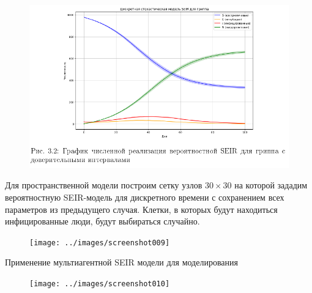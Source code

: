 \documentclass[notheorems]{beamer}
\begin{document}
\begin{frame}
	\begin{figure}
		\centering
		\includegraphics[scale=0.5]{"../../Курсовая работа MFVAR/slides/screenshot008"}
		\caption{}
		\label{fig:screenshot008}
	\end{figure}
	
\end{frame}

\begin{frame}
	Для пространственной модели построим сетку узлов $30 \times 30$ на которой зададим вероятностную SEIR-модель для дискретного времени с сохранением всех параметров из предыдущего случая. Клетки, в которых будут находиться инфицированные люди, будут выбираться случайно.
	\begin{figure}
		\centering
		\texttt{[image: ../images/screenshot009]}
		\caption{}
		\label{fig:screenshot009}
	\end{figure}
	
\end{frame}

\begin{frame}
	
	{Применение мультиагентной SEIR модели для моделирования}
	\begin{figure}
		\centering
		\texttt{[image: ../images/screenshot010]}
		\caption{}
		\label{fig:screenshot010}
	\end{figure}
	
\end{frame}
\end{document}
